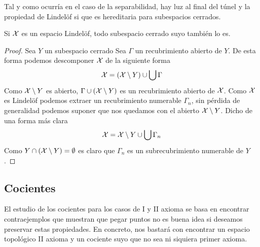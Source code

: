 Tal y como ocurría en el caso de la separabilidad, hay luz al final del túnel y la propiedad de Lindelöf si que es hereditaria para subespacios cerrados.
\begin{lem}
	Si $\mathcal{X}$ es un espacio Lindelöf, todo subespacio cerrado suyo también lo es.
\end{lem}
\begin{proof}
	Sea $Y$ un subespacio cerrado Sea $\Gamma$ un recubrimiento abierto de $Y$. De esta forma podemos descomponer $\mathcal{X}$ de la siguiente forma
	\begin{equation*}
		\mathcal{X}=(\mathcal{X}\setminus Y)\cup\bigcup\Gamma
	\end{equation*}
	Como $\mathcal{X}\setminus Y$ es abierto, $\Gamma\cup(\mathcal{X}\setminus Y)$ es un recubrimiento abierto de $\mathcal{X}$. Como $\mathcal{X}$ es Lindelöf podemos extraer un recubrimiento numerable $\Gamma_n$, sin pérdida de generalidad podemos suponer que nos quedamos con el abierto $\mathcal{X}\setminus Y$. Dicho de una forma más clara
	\begin{equation*}
		\mathcal{X}=\mathcal{X}\setminus Y\cup \bigcup\Gamma_n
	\end{equation*}
	Como $Y\cap(\mathcal{X}\setminus Y)=\emptyset$ es claro que $\Gamma_n$ es un subrecubrimiento numerable de $Y$.
\end{proof}
\subsection{Cocientes}
El estudio de los cocientes para los casos de I y II axioma se basa en encontrar contraejemplos que muestran que pegar puntos no es buena idea si deseamos preservar estas propiedades. En concreto, nos bastará con encontrar un espacio topológico II axioma y un cociente suyo que no sea ni siquiera primer axioma.

